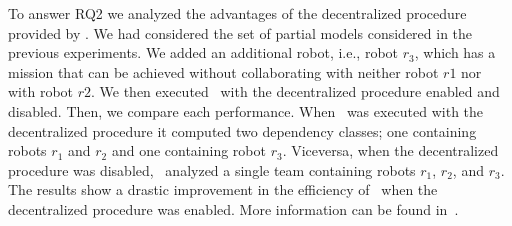 To answer RQ2 we analyzed the advantages of the decentralized procedure provided by \toolName.
We had considered the set of partial models considered in the previous experiments. 
We added an additional robot, i.e., robot $r_3$, which has a mission that can be achieved without collaborating with neither  robot $r1$ nor with robot $r2$. 
We then executed \toolName\ with the decentralized procedure enabled and disabled. 
Then, we compare each performance. 
When \toolName\ was executed with the  decentralized procedure it computed two dependency classes; one containing robots $r_1$ and $r_2$ and one containing robot $r_3$. 
Viceversa, when the decentralized procedure was disabled, \toolName\ 
analyzed a single team containing  robots $r_1$, $r_2$, and $r_3$. 
The results show a drastic improvement in the efficiency of \toolName\ when the decentralized procedure was enabled.
More information can be found in~\cite{menghi2018multi}.



